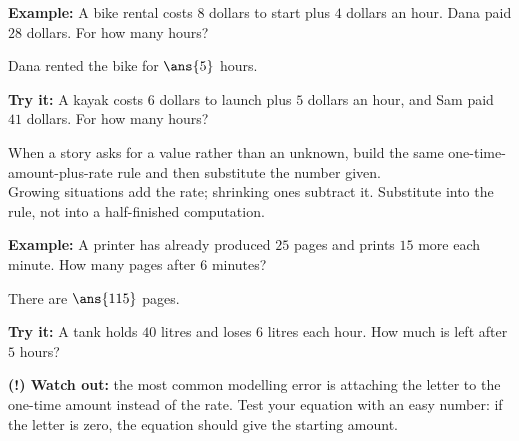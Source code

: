 \documentclass[12pt]{article}
\begin{document}
\begin{examplebox}
\textbf{Example:} A bike rental costs $8$ dollars to start plus $4$ dollars an
hour. Dana paid $28$ dollars. For how many hours?

Dana rented the bike for $\ans{5}$ hours.
\end{examplebox}

\begin{tryitbox}
\textbf{Try it:} A kayak costs $6$ dollars to launch plus $5$ dollars an hour,
and Sam paid $41$ dollars. For how many hours?\\[2pt]
\end{tryitbox}


\begin{formulabox}
When a story asks for a value rather than an unknown, build the same
one-time-amount-plus-rate rule and then substitute the number given.\\[3pt]
Growing situations add the rate; shrinking ones subtract it. Substitute into
the rule, not into a half-finished computation.
\end{formulabox}

\begin{examplebox}
\textbf{Example:} A printer has already produced $25$ pages and prints $15$
more each minute. How many pages after $6$ minutes?

There are $\ans{115}$ pages.
\end{examplebox}

\begin{tryitbox}
\textbf{Try it:} A tank holds $40$ litres and loses $6$ litres each hour. How
much is left after $5$ hours?\\[2pt]
\end{tryitbox}

\begin{watchoutbox}
\textbf{(!) Watch out:} the most common modelling error is attaching the letter
to the one-time amount instead of the rate. Test your equation with an easy
number: if the letter is zero, the equation should give the starting amount.
\end{watchoutbox}
\end{document}
